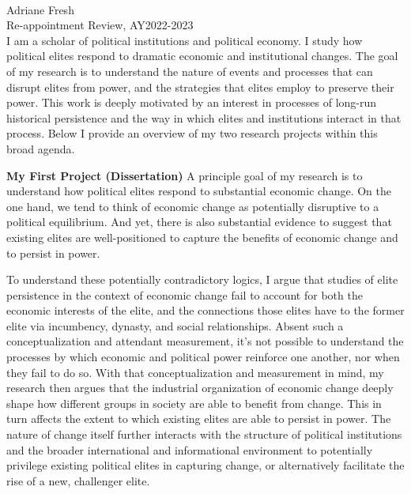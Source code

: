 \documentclass[11pt]{article}
\begin{document}
\singlespacing
\setlength{\parindent}{0in}
\setlength{\parskip}{.15in}







\noindent \large{\textbf{}} \\ \normalsize
\noindent Adriane Fresh \\
\noindent Re-appointment Review, AY2022-2023  \\


I am a scholar of political institutions and political economy.  I study how political elites respond to dramatic economic and institutional changes.  The goal of my research is to understand the nature of events and processes that can disrupt elites from power, and the strategies that elites employ to preserve their power.  This work is deeply motivated by an interest in processes of long-run historical persistence and the way in which elites and institutions interact in that process.  Below I provide an overview of my two research projects within this broad agenda.

\vspace*{.02in}
\textbf{My First Project (Dissertation)} \hspace*{.12in} A principle goal of my research is to understand how political elites respond to substantial economic change. On the one hand, we tend to think of economic change as potentially disruptive to a political equilibrium.  And yet, there is also substantial evidence to suggest that existing elites are well-positioned to capture the benefits of economic change and to persist in power.

To understand these potentially contradictory logics, I argue that studies of elite persistence in the context of economic change fail to account for both the economic interests of the elite, and the connections those elites have to the former elite via incumbency, dynasty, and social relationships.  Absent such a conceptualization and attendant measurement, it's not possible to understand the processes by which economic and political power reinforce one another, nor when they fail to do so.  With that conceptualization and measurement in mind, my research then argues that the industrial organization of economic change deeply shape how different groups in society are able to benefit from change.  This in turn affects the extent to which existing elites are able to persist in power.  The nature of change itself further interacts with the structure of political institutions and the broader international and informational environment to potentially privilege existing political elites in capturing change, or alternatively facilitate the rise of a new, challenger elite.
\end{document}
